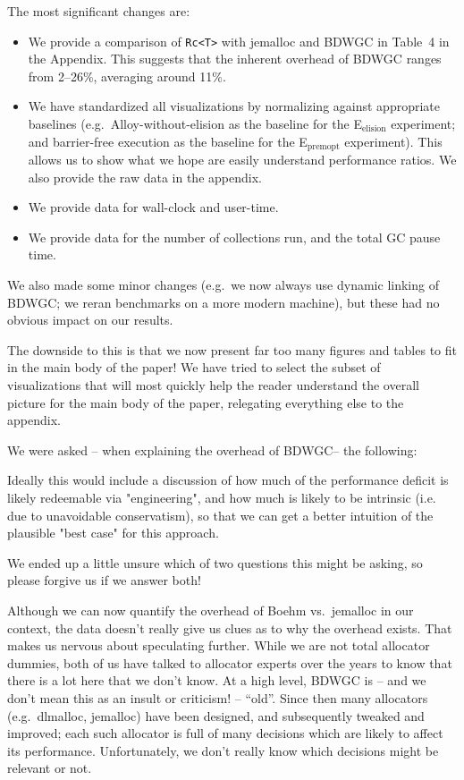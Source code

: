 \documentclass[12pt,a4paper,preprint]{article}
\newcommand\Eelision{E$_\textrm{elision}$\xspace}
\newcommand\Epremopt{E$_\textrm{premopt}$\xspace}
\newcommand\boehm{\textsc{BDWGC}\xspace}
\begin{document}
The most significant changes are:

\begin{itemize}
  \item We provide a comparison of \lstinline{Rc<T>} with jemalloc and \boehm
    in Table~4 in the Appendix. This suggests that the inherent
    overhead of \boehm ranges from 2--26\%, averaging around 11\%.

  \item We have standardized all visualizations by normalizing against
    appropriate baselines (e.g.~Alloy-without-elision as the baseline for
    the \Eelision experiment; and barrier-free execution as the baseline
    for the \Epremopt experiment). This allows us to show what we hope
    are easily understand performance ratios. We also provide the raw data
    in the appendix.

  \item We provide data for wall-clock and user-time.

  \item We provide data for the number of collections run, and the total GC
  pause time.
\end{itemize}

We also made some minor changes (e.g.~we now always use dynamic
linking of \boehm; we reran benchmarks on a more modern machine), but
these had no obvious impact on our results.

The downside to this is that we now present far too many figures and tables to
fit in the main body of the paper! We have tried to select the subset of
visualizations that will most quickly help the reader understand the overall
picture for the main body of the paper, relegating everything else to the
appendix.

We were asked -- when explaining the overhead of \boehm -- the following:

\begin{blockquote}
Ideally this would include a
discussion of how much of the performance deficit is likely redeemable via
"engineering", and how much is likely to be intrinsic (i.e. due to
unavoidable conservatism), so that we can get a better intuition of the
plausible "best case" for this approach.
\end{blockquote}

We ended up a little unsure which of two questions this might be asking,
so please forgive us if we answer both!

Although we can now quantify the overhead of Boehm vs.~jemalloc in our context,
the data doesn't really give us clues as to why the overhead exists. That makes
us nervous about speculating further. While we are not total allocator dummies,
both of us have talked to allocator experts over the years to know that there is a lot
here that we don't know. At a high level, \boehm is -- and we don't mean this as an
insult or criticism! -- ``old''. Since then many allocators (e.g.~dlmalloc, jemalloc)
have been designed, and subsequently tweaked and improved; each such allocator
is full of many decisions which are likely to affect its performance. Unfortunately,
we don't really know which decisions might be relevant or not.
\end{document}
